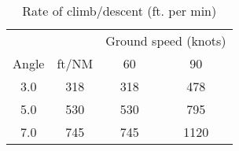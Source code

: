 \documentclass{article}
\begin{document}
\lsstyle

\begin{table}[ht]
    \caption{Rate of climb/descent (ft. per min)}

    \begin{center}
        \begin{tabular}{cccc}
            \toprule
                             &       & \multicolumn{2}{c}{Ground speed (knots)}
            \\\cmidrule(lr){3-4}
            Angle            & ft/NM & 60                                       & 90   \\
            \midrule
            3.0\textdegree{} & 318   & 318                                      & 478  \\
            5.0\textdegree{} & 530   & 530                                      & 795  \\
            7.0\textdegree{} & 745   & 745                                      & 1120 \\
        \end{tabular}
    \end{center}
\end{table}
\end{document}

